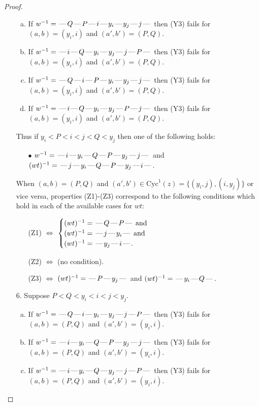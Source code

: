 \documentclass[10pt]{article}
\theoremstyle{definition}
\theoremstyle{definition}
\def\dash{\text{\hspace{0.5mm}---\hspace{0.5mm}}}
\def\Cyc{\mathrm{Cyc}}
\begin{document}
\begin{proof}
\begin{enumerate}
\begin{enumerate}[(a)]
\item If $w^{-1} = \dash Q\dash P\dash i\dash y_i\dash y_j\dash j\dash $ then (Y3) fails for $(a,b)=(y_i,i)$ and $(a',b')=(P,Q)$.
\item If $w^{-1} = \dash i\dash Q\dash y_i\dash y_j\dash j\dash P\dash $ then (Y3) fails for $(a,b)=(y_i,i)$ and $(a',b')=(P,Q)$.
\item If $w^{-1} = \dash Q\dash i\dash P\dash y_i\dash y_j\dash j\dash $ then (Y3) fails for $(a,b)=(y_i,i)$ and $(a',b')=(P,Q)$.
\item If $w^{-1} = \dash i\dash Q\dash y_i\dash y_j\dash P\dash j\dash $ then (Y3) fails for $(a,b)=(y_i,i)$ and $(a',b')=(P,Q)$.
\end{enumerate}
Thus if $y_i < P < i < j < Q < y_j$ then one of the following holds:
\begin{enumerate}
\item[$\bullet$] $w^{-1} = \dash i\dash y_i\dash Q\dash P\dash y_j\dash j\dash $ and $(wt)^{-1} = \dash j\dash y_i\dash Q\dash P\dash y_j\dash i\dash $.
\end{enumerate}
When $(a,b)= (P,Q)$ and $(a',b')\in \Cyc^1(z)=\{(y_i,j),(i,y_j)\}$ or vice versa,
properties (Z1)-(Z3) correspond to the following conditions which
hold in each of the available cases for $wt$:
\begin{enumerate}
\item[](Z1) $\Leftrightarrow$ $\begin{cases}\text{$(wt)^{-1} = \dash Q \dash P \dash$}\text{ and }\\
\text{$(wt)^{-1} = \dash j \dash y_i \dash$}\text{ and }\\
\text{$(wt)^{-1} = \dash y_j \dash i \dash$}.\end{cases}$
\item[](Z2) $\Leftrightarrow$ (no condition).
\item[](Z3) $\Leftrightarrow$ $(wt)^{-1} = \dash P \dash y_j \dash$  and $(wt)^{-1} = \dash y_i \dash Q \dash$.
\end{enumerate}
\item[$6$.] Suppose $P < Q < y_i < i < j < y_j$.
\begin{enumerate}[(a)]
\item If $w^{-1} = \dash Q\dash i\dash y_i\dash y_j\dash j\dash P\dash $ then (Y3) fails for $(a,b)=(P,Q)$ and $(a',b')=(y_i,i)$.
\item If $w^{-1} = \dash i\dash y_i\dash Q\dash P\dash y_j\dash j\dash $ then (Y3) fails for $(a,b)=(P,Q)$ and $(a',b')=(y_i,i)$.
\item If $w^{-1} = \dash i\dash y_i\dash Q\dash y_j\dash j\dash P\dash $ then (Y3) fails for $(a,b)=(P,Q)$ and $(a',b')=(y_i,i)$.

\end{enumerate}
\end{enumerate}
\end{proof}
\end{document}
